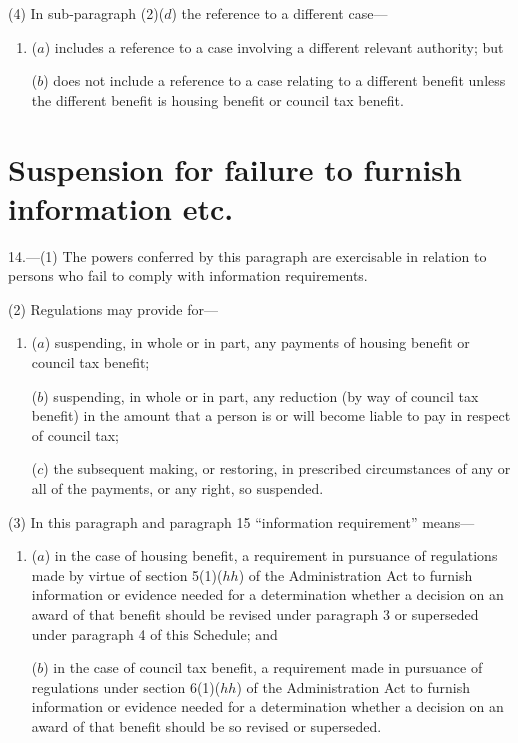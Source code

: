 \documentclass[12pt,a4paper]{article}
\begin{document}
(4) In sub-paragraph (2)($d$)  the reference to a different case—
\begin{enumerate}\item[]
($a$) includes a reference to a case involving a different relevant authority; but

($b$) does not include a reference to a case relating to a different benefit unless the different benefit is housing benefit or council tax benefit.
\end{enumerate}


\section*{Suspension for failure to furnish information etc.}

14.---(1) The powers conferred by this paragraph are exercisable in relation to persons who fail to comply with information requirements.

(2) Regulations may provide for—
\begin{enumerate}\item[]
($a$) suspending, in whole or in part, any payments of housing benefit or council tax benefit;

($b$) suspending, in whole or in part, any reduction (by way of council tax benefit) in the amount that a person is or will become liable to pay in respect of council tax;

($c$) the subsequent making, or restoring, in prescribed circumstances of any or all of the payments, or any right, so suspended.
\end{enumerate}

(3) In this paragraph and paragraph 15 “information requirement” means—
\begin{enumerate}\item[]
($a$) in the case of housing benefit, a requirement in pursuance of regulations made by virtue of section 5(1)($hh$)  of the Administration Act to furnish information or evidence needed for a determination whether a decision on an award of that benefit should be revised under paragraph 3 or superseded under paragraph 4 of this Schedule; and

($b$) in the case of council tax benefit, a requirement made in pursuance of regulations under section 6(1)($hh$)  of the Administration Act to furnish information or evidence needed for a determination whether a decision on an award of that benefit should be so revised or superseded.
\end{enumerate}
\end{document}
